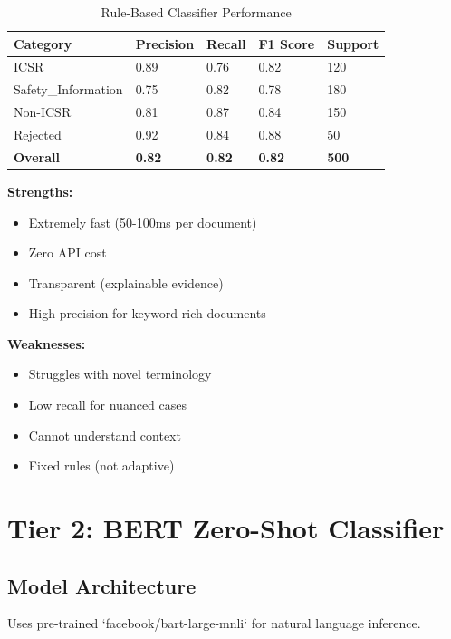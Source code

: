 \begin{table}[h]
\centering
\caption{Rule-Based Classifier Performance}
\begin{tabularx}{\textwidth}{lXXXX}
\toprule
\textbf{Category} & \textbf{Precision} & \textbf{Recall} & \textbf{F1 Score} & \textbf{Support} \\
\midrule
ICSR & 0.89 & 0.76 & 0.82 & 120 \\
Safety\_Information & 0.75 & 0.82 & 0.78 & 180 \\
Non-ICSR & 0.81 & 0.87 & 0.84 & 150 \\
Rejected & 0.92 & 0.84 & 0.88 & 50 \\
\textbf{Overall} & \textbf{0.82} & \textbf{0.82} & \textbf{0.82} & \textbf{500} \\
\bottomrule
\end{tabularx}
\end{table}

\textbf{Strengths:}
\begin{itemize}
    \item Extremely fast (50-100ms per document)
    \item Zero API cost
    \item Transparent (explainable evidence)
    \item High precision for keyword-rich documents
\end{itemize}

\textbf{Weaknesses:}
\begin{itemize}
    \item Struggles with novel terminology
    \item Low recall for nuanced cases
    \item Cannot understand context
    \item Fixed rules (not adaptive)
\end{itemize}

\section{Tier 2: BERT Zero-Shot Classifier}

\subsection{Model Architecture}

Uses pre-trained `facebook/bart-large-mnli` for natural language inference.

